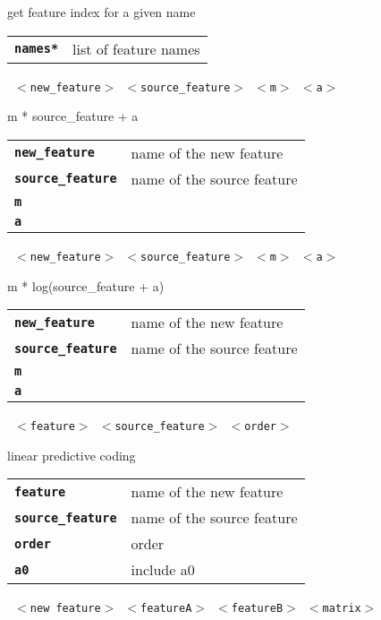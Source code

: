 \begin{description}
\begin{description}
        get feature index for a given name

      \begin{tabular}{ll}
 \texttt{\textbf{names*}} & list of feature names \\
      \end{tabular}
       \texttt{ $<$new\_feature$>$ $<$source\_feature$>$ $<$m$>$ $<$a$>$} \

        m * source\_feature + a

      \begin{tabular}{ll}
 \texttt{\textbf{new\_feature}} &     name of the new feature \\
 \texttt{\textbf{source\_feature}} &  name of the source feature \\
 \texttt{\textbf{m}} &                 \\
 \texttt{\textbf{a}} &                 \\
      \end{tabular}
       \texttt{ $<$new\_feature$>$ $<$source\_feature$>$ $<$m$>$ $<$a$>$} \

        m * log(source\_feature + a)

      \begin{tabular}{ll}
 \texttt{\textbf{new\_feature}} &     name of the new feature \\
 \texttt{\textbf{source\_feature}} &  name of the source feature \\
 \texttt{\textbf{m}} &                 \\
 \texttt{\textbf{a}} &                 \\
      \end{tabular}
       \texttt{ $<$feature$>$ $<$source\_feature$>$ $<$order$>$ } \

        linear predictive coding

      \begin{tabular}{ll}
 \texttt{\textbf{feature}} &         name of the new feature \\
 \texttt{\textbf{source\_feature}} &  name of the source feature \\
 \texttt{\textbf{order}} &           order  \\
 \texttt{\textbf{a0}} &               include a0  \\
      \end{tabular}
       \texttt{ $<$new feature$>$ $<$featureA$>$ $<$featureB$>$ $<$matrix$>$} \


\end{description}
\end{description}
